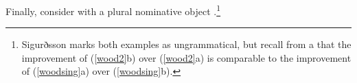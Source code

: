 \documentclass[output=paper]{langscibook}
\begin{document}
Finally, consider  \sti with a plural nominative object \citep[33]{SigurTHsson:1996va}.\footnote{Sigurðsson marks both examples as ungrammatical, but recall from a that the improvement of (\ref{wood2}b) over (\ref{wood2}a) is comparable to the improvement of (\ref{woodsing}a) over (\ref{woodsing}b).}


\ea {}\label{wood2} 

    \z
\z
\end{document}
